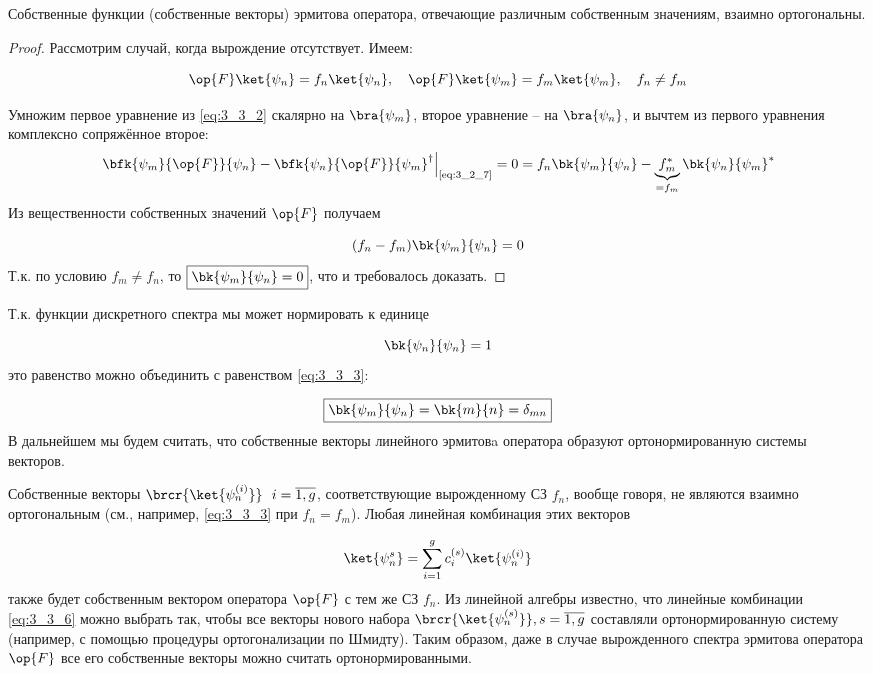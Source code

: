 \begin{stmt}
Собственные функции (собственные векторы) эрмитова оператора, отвечающие различным собственным значениям, взаимно ортогональны.
\end{stmt}
%
\begin{proof}

Рассмотрим случай, когда вырождение отсутствует. Имеем:

\begin{equation}
  \label{eq:3_3_2}
	\op{F}\ket{\psi_n} = f_n \ket{\psi_n},~~~
  \op{F}\ket{\psi_m} = f_m \ket{\psi_m},~~~
  f_n \neq f_m
\end{equation}

Умножим первое уравнение из \eqref{eq:3_3_2} скалярно на $\bra{\psi_m}$, второе уравнение -- на $\bra{\psi_n}$, и вычтем из первого уравнения комплексно сопряжённое второе:
$$
\left.
  \bfk{\psi_m}{\op{F}}{\psi_n} - \bfk{\psi_n}{\op{F}}{\psi_m}^\dag
      \right|_{\text{\eqref{eq:3_2_7}}} = 0 =
  f_n \bk{\psi_m}{\psi_n} - \underbrace{f_m^*}_{= f_m} \bk{\psi_n}{\psi_m}^*
$$%
%
Из вещественности собственных значений $\op{F}$ получаем

\begin{equation}
\label{eq:3_3_3}
(f_n - f_m) \bk{\psi_m}{\psi_n} = 0
\end{equation}%
%
Т.к. по условию $f_m \neq f_n$, то $\boxed{\bk{\psi_m}{\psi_n} = 0}$, что и требовалось доказать.
\end{proof}

Т.к. функции дискретного спектра мы может нормировать к единице

\begin{equation}
\label{eq:3_3_4}
\bk{\psi_n}{\psi_n} = 1
\end{equation}%
%
это равенство можно объединить с равенством \eqref{eq:3_3_3}:

\begin{equation}
\label{eq:3_3_5}
\boxed{
	\bk{\psi_m}{\psi_n} = \bk{m}{n} = \delta_{mn}
}
\end{equation}%
%
В дальнейшем мы будем считать, что собственные векторы линейного эрмитовa оператора образуют ортонормированную системы векторов.

Собственные векторы $\brcr{\ket{\psi_n^{(i)}}} ~~ i = \overline{1,g}$, соответствующие вырожденному СЗ $f_n$, вообще говоря, не являются взаимно ортогональным (см., например, \eqref{eq:3_3_3} при $f_n = f_m$). Любая линейная комбинация этих векторов

\begin{equation}
\label{eq:3_3_6}
\ket{\psi_n^s} = \sum_{i=1}^{g} c_i^{(s)} \ket{\psi_n^{(i)}}
\end{equation}%
%
также будет собственным вектором оператора $\op{F}$ с тем же СЗ $f_n$. Из линейной алгебры известно, что линейные комбинации \eqref{eq:3_3_6} можно выбрать так, чтобы все векторы нового набора $\brcr{\ket{\psi_n^{(s)}}}, s = \overline{1,g}$ составляли ортонормированную систему (например, с помощью процедуры ортогонализации по Шмидту). Таким образом, даже в случае вырожденного спектра эрмитова оператора $\op{F}$ все его собственные векторы можно считать ортонормированными.

